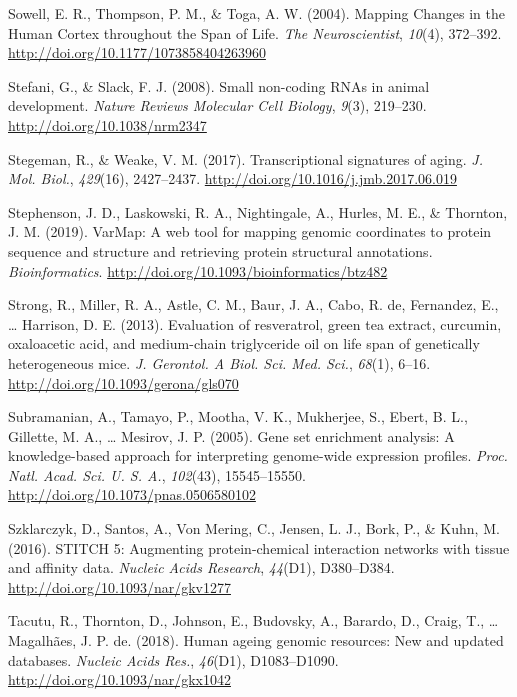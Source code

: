 \documentclass[12pt,twoside]{unicam}
\begin{document}
\begin{cslreferences}
\leavevmode\hypertarget{ref-Sowell2004}{}%
Sowell, E. R., Thompson, P. M., \& Toga, A. W. (2004). Mapping Changes in the Human Cortex throughout the Span of Life. \emph{The Neuroscientist}, \emph{10}(4), 372--392. \url{http://doi.org/10.1177/1073858404263960}

\leavevmode\hypertarget{ref-Stefani2008}{}%
Stefani, G., \& Slack, F. J. (2008). Small non-coding RNAs in animal development. \emph{Nature Reviews Molecular Cell Biology}, \emph{9}(3), 219--230. \url{http://doi.org/10.1038/nrm2347}

\leavevmode\hypertarget{ref-Stegeman2017}{}%
Stegeman, R., \& Weake, V. M. (2017). Transcriptional signatures of aging. \emph{J. Mol. Biol.}, \emph{429}(16), 2427--2437. \url{http://doi.org/10.1016/j.jmb.2017.06.019}

\leavevmode\hypertarget{ref-Stephenson2019}{}%
Stephenson, J. D., Laskowski, R. A., Nightingale, A., Hurles, M. E., \& Thornton, J. M. (2019). VarMap: A web tool for mapping genomic coordinates to protein sequence and structure and retrieving protein structural annotations. \emph{Bioinformatics}. \url{http://doi.org/10.1093/bioinformatics/btz482}

\leavevmode\hypertarget{ref-Strong2013}{}%
Strong, R., Miller, R. A., Astle, C. M., Baur, J. A., Cabo, R. de, Fernandez, E., \ldots{} Harrison, D. E. (2013). Evaluation of resveratrol, green tea extract, curcumin, oxaloacetic acid, and medium-chain triglyceride oil on life span of genetically heterogeneous mice. \emph{J. Gerontol. A Biol. Sci. Med. Sci.}, \emph{68}(1), 6--16. \url{http://doi.org/10.1093/gerona/gls070}

\leavevmode\hypertarget{ref-Subramanian2005}{}%
Subramanian, A., Tamayo, P., Mootha, V. K., Mukherjee, S., Ebert, B. L., Gillette, M. A., \ldots{} Mesirov, J. P. (2005). Gene set enrichment analysis: A knowledge-based approach for interpreting genome-wide expression profiles. \emph{Proc. Natl. Acad. Sci. U. S. A.}, \emph{102}(43), 15545--15550. \url{http://doi.org/10.1073/pnas.0506580102}

\leavevmode\hypertarget{ref-Szklarczyk2016}{}%
Szklarczyk, D., Santos, A., Von Mering, C., Jensen, L. J., Bork, P., \& Kuhn, M. (2016). STITCH 5: Augmenting protein-chemical interaction networks with tissue and affinity data. \emph{Nucleic Acids Research}, \emph{44}(D1), D380--D384. \url{http://doi.org/10.1093/nar/gkv1277}

\leavevmode\hypertarget{ref-Tacutu2018}{}%
Tacutu, R., Thornton, D., Johnson, E., Budovsky, A., Barardo, D., Craig, T., \ldots{} Magalhães, J. P. de. (2018). Human ageing genomic resources: New and updated databases. \emph{Nucleic Acids Res.}, \emph{46}(D1), D1083--D1090. \url{http://doi.org/10.1093/nar/gkx1042}


\end{cslreferences}
\end{document}
